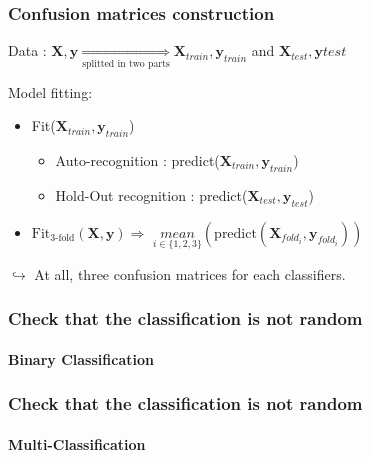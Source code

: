 \documentclass[11pt, sans]{beamer}
\newcommand{\X}{\mathbf{X}}
\newcommand{\Xr}{\mathbf{X}_{train}}
\newcommand{\Xt}{\mathbf{X}_{test}}
\newcommand{\y}{\mathbf{y}}
\newcommand{\yr}{\mathbf{y}_{train}}
\newcommand{\yt}{\mathbf{y}_{test}}
\begin{document}
\begin{frame}
\frametitle{Confusion matrices construction}

Data : $ \X, \y \underset{\text{splitted in two parts}}{\Longrightarrow} \Xr, \y_{train}$ and $ \Xt, \y{test}$

\bigskip

Model fitting:

\begin{itemize}
	\item Fit($\Xr,\yr$)
	\begin{itemize}
		\item Auto-recognition : predict($\Xr,\yr$)
		\item Hold-Out recognition : predict($\Xt, \yt$)
	\end{itemize}
	\item $\text{Fit}_{\text{3-fold}}(\X,\y) \Longrightarrow $ $\underset{i \in \{1,2,3\}}{mean}(\text{predict}(\X_{fold_i}, \y_{fold_i}))$
\end{itemize}

$\hookrightarrow$ At all, three confusion matrices for each classifiers.

\end{frame}

\begin{frame}
\frametitle{Check that the classification is not random}
\framesubtitle{Binary Classification}

 \begin{overprint}
   
	 
	
 \end{overprint} 

\end{frame}

\begin{frame}
\frametitle{Check that the classification is not random}
\framesubtitle{Multi-Classification}

 \begin{overprint}
   
	 
	
 \end{overprint} 

\end{frame}
\end{document}
